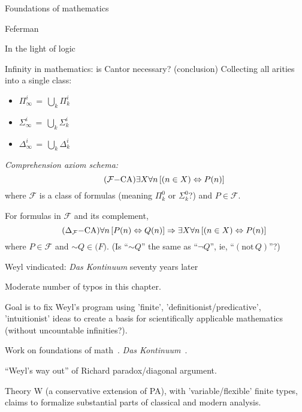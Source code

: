 \begin{plSection}{Foundations of mathematics}
\begin{plSection}{Feferman}
\begin{plSection}{In the light of logic}
\begin{plSection}{Infinity in mathematics: is Cantor necessary? (conclusion)}
Collecting all arities into a single class:
\begin{itemize}
  \item $\Pi^i_{\infty} \, = \, \bigcup_k \Pi^i_k$
  \item $\Sigma^i_{\infty} \, = \, \bigcup_k \Sigma^i_k$
  \item $\Delta^i_{\infty} \, = \, \bigcup_k \Delta^i_k$
\end{itemize}

\textit{Comprehension axiom schema:}
\begin{equation}
\tag{$\mathcal{F}{-}\text{CA}$}
\exists X \forall n \left[ (n \in X) \Leftrightarrow P(n) \right]
\end{equation}
where $\mathcal{F}$ is a class of formulas 
\textsf{(meaning $\Pi^0_k$ or $\Sigma^0_k$?)}
and $P \in \mathcal{F}$.

For formulas in $\mathcal{F}$ and its complement,
\begin{equation}
\tag{$\Delta_{\mathcal{F}}{-}\text{CA}$}
\forall n \left[ P(n) \Leftrightarrow Q(n) \right]
\Rightarrow 
\exists X \forall n \left[ (n \in X) \Leftrightarrow P(n) \right]
\end{equation}
where $P \in \mathcal{F}$ and $\sim Q \in \mathcal(F)$.
\textsf{
(Is ``$\sim Q$'' the same as ``$\lnot Q$'', ie, 
``$(\text{not}\, Q)$''?)}

\end{plSection}%
\begin{plSection}{Weyl vindicated: \textit{Das Kontinuum} seventy years later}
\label{sec:Weyl_vindicated}

Moderate number of typos in this 
chapter.~\cite[ch~13 ``Weyl vindicated: \textit{Das Kontinuum} seventy years later'']{Feferman:1998:LightOfLogic}

Goal is to fix Weyl's program 
using 'finite', 'definitionist/predicative', 'intuitionist' ideas
to create a basis for scientifically applicable mathematics
(without uncountable infinities?).

Work on foundations of math~\cite{Weyl:1910:Definitionen}.
\textit{Das Kontinuum}~\cite{Weyl:1918:Kontinuum,Weyl:1987:Continuum}.

``Weyl's way out'' of Richard paradox/diagonal 
argument.~\cite[p 262]{Feferman:1998:LightOfLogic} 

Theory W (a conservative extension of PA),
with 'variable/flexible' finite types,
claims to formalize substantial parts of
classical and modern 
analysis.~\cite[ch~13 sec~8]{Feferman:1998:LightOfLogic}


\end{plSection}
\end{plSection}
\end{plSection}
\end{plSection}
